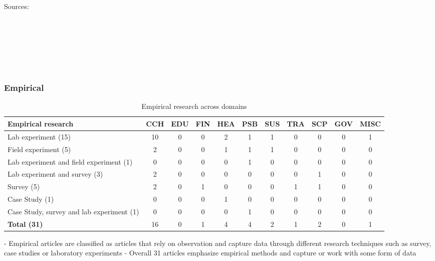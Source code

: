 Sources:
\cite{cao_economic_2018} \\
\cite{yoo_consumer_2018} \\
\cite{gamliel_average_2017} \\
\cite{munscher_review_2016} \\
\cite{broniarczyk_decision_2014} \\
\cite{lades_impulsive_2014} \\
\cite{dolan_influencing_2012} \\


\subsubsection{Empirical}
\begin{table}[htbp]
\small
\centering
\begin{tabular}{p{3.6cm}|cccccccccc}
\textbf{Empirical research} & \textbf{CCH} & \textbf{EDU} & \textbf{FIN} & \textbf{HEA} & \textbf{PSB} & \textbf{SUS} & \textbf{TRA} & \textbf{SCP} & \textbf{GOV} & \textbf{MISC} \\ \hline
Lab experiment (15) & 10 & 0 & 0 & 2 & 1 & 1 & 0 & 0 & 0 & 1 \\
Field experiment (5) & 2 & 0 & 0 & 1 & 1 & 1 & 0 & 0 & 0 & 0 \\
Lab experiment and field experiment (1) & 0 & 0 & 0 & 0 & 1 & 0 & 0 & 0 & 0 & 0 \\
Lab experiment and survey (3) & 2 & 0 & 0 & 0 & 0 & 0 & 0 & 1 & 0 & 0 \\
Survey (5) & 2 & 0 & 1 & 0 & 0 & 0 & 1 & 1 & 0 & 0 \\
Case Study (1) & 0 & 0 & 0 & 1 & 0 & 0 & 0 & 0 & 0 & 0 \\
Case Study, survey and lab experiment (1) & 0 & 0 & 0 & 0 & 1 & 0 & 0 & 0 & 0 & 0 \\ \hline
\textbf{Total (31)} & 16 & 0 & 1 & 4 & 4 & 2 & 1 & 2 & 0 & 1
\end{tabular}
\caption{Empirical research across domains}
\label{table:empirical}
\end{table}

- Empirical articles are classified as articles that rely on observation and capture data through different research techniques such as survey, case studies or laboratory experiments \cite{alavi_review_1992}
- Overall 31 articles emphasize empirical methods and capture or work with some form of data


